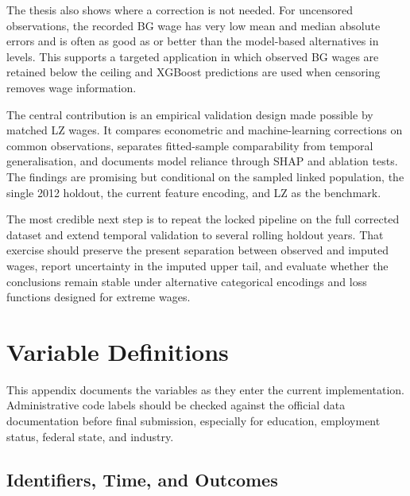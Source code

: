 \documentclass[12pt,a4paper,oneside,titlepage]{book}
\begin{document}
The thesis also shows where a correction is not needed. For uncensored observations, the recorded BG wage has very low mean and median absolute errors and is often as good as or better than the model-based alternatives in levels. This supports a targeted application in which observed BG wages are retained below the ceiling and XGBoost predictions are used when censoring removes wage information.

The central contribution is an empirical validation design made possible by matched LZ wages. It compares econometric and machine-learning corrections on common observations, separates fitted-sample comparability from temporal generalisation, and documents model reliance through SHAP and ablation tests. The findings are promising but conditional on the sampled linked population, the single 2012 holdout, the current feature encoding, and LZ as the benchmark.

The most credible next step is to repeat the locked pipeline on the full corrected dataset and extend temporal validation to several rolling holdout years. That exercise should preserve the present separation between observed and imputed wages, report uncertainty in the imputed upper tail, and evaluate whether the conclusions remain stable under alternative categorical encodings and loss functions designed for extreme wages.

\appendix

\chapter{Variable Definitions}
\label{app:variables}

This appendix documents the variables as they enter the current implementation. Administrative code labels should be checked against the official data documentation before final submission, especially for education, employment status, federal state, and industry.

\section{Identifiers, Time, and Outcomes}
\end{document}
